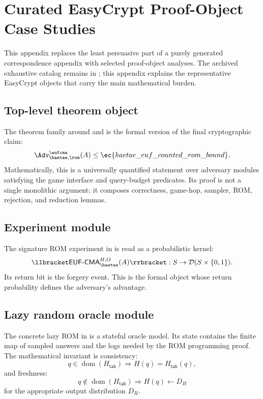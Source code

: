 \chapter{Curated EasyCrypt Proof-Object Case Studies}
\label{app:curated-easycrypt-case-studies}

This appendix replaces the least persuasive part of a purely generated
correspondence appendix with selected proof-object analyses.  The archived
exhaustive catalog remains in ; this appendix explains the
representative EasyCrypt objects that carry the main mathematical burden.

\section{Top-level theorem object}

The theorem family around  and
 is the formal version of the final
cryptographic claim:
\[
  \Adv_{\haetae,\rom}^{\eufcma}(A)
  \le
  \ec{haetae\_euf\_counted\_rom\_bound}.
\]
Mathematically, this is a universally quantified statement over adversary
modules satisfying the game interface and query-budget predicates.  Its proof is
not a single monolithic argument; it composes correctness, game-hop, sampler,
ROM, rejection, and reduction lemmas.

\section{Experiment module}

The signature ROM experiment in  is read as a probabilistic
kernel:
\[
  \llbracket \mathsf{EUF\mbox{-}CMA}^{H,O}_{\haetae}(A)\rrbracket
  : S\to\mathcal{D}(S\times\{0,1\}).
\]
Its return bit is the forgery event.  This is the formal object whose return
probability defines the adversary's advantage.

\section{Lazy random oracle module}

The concrete lazy ROM in  is a stateful oracle model.  Its
state contains the finite map of sampled answers and the logs needed by the ROM
programming proof.  The mathematical invariant is consistency:
\[
  q\in\operatorname{dom}(H_{\mathsf{tab}})
  \Rightarrow
  H(q)=H_{\mathsf{tab}}(q),
\]
and freshness:
\[
  q\notin\operatorname{dom}(H_{\mathsf{tab}})
  \Rightarrow
  H(q)\leftarrow D_H
\]
for the appropriate output distribution \(D_H\).

